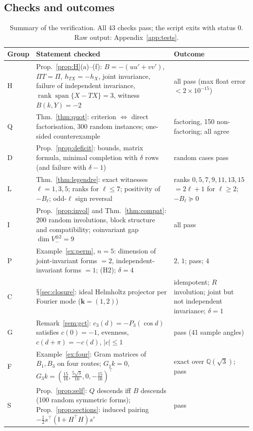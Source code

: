 \documentclass[11pt,a4paper]{article}
\renewcommand{\S}{\ensuremath{\mathsection}}
\newcommand{\rk}{\operatorname{rank}}
\newcommand{\spn}{\operatorname{span}}
\newcommand{\defic}{\delta}
\theoremstyle{plain}
\theoremstyle{definition}
\begin{document}
\subsection{Checks and outcomes}
\begin{table}[t]
\centering\small
\begin{tabularx}{\textwidth}{@{}l>{\raggedright\arraybackslash}X>{\raggedright\arraybackslash}p{}@{}}
\toprule
Group & Statement checked & Outcome\\
\midrule
H & Prop.~\ref{prop:H}(a)--(f): $B=-(uu'+vv')$, $\Pi T=\Pi$, $h_{TX}=-h_X$, joint invariance, failure of independent invariance, $\rk\spn\{X-TX\}=3$, witness $B(k,Y)=-2$ & all pass (max float error $<2\times10^{-15}$)\\
Q & Thm.~\ref{thm:quot}: criterion $\Leftrightarrow$ direct factorisation, 300 random instances; one-sided counterexample & 150 factoring, 150 non-factoring; all agree\\
D & Prop.~\ref{prop:deficit}: bounds, matrix formula, minimal completion with $\defic$ rows (and failure with $\defic-1$) & 300 random cases pass\\
L & Thm.~\ref{thm:legendre}: exact witnesses $\ell=1,3,5$; ranks for $\ell\le7$; positivity of $-B_\ell$; odd-$\ell$ sign reversal & ranks $0,5,7,9,11,13,15$ $=2\ell+1$ for $\ell\ge2$; $-B_\ell\succeq0$\\
I & Prop.~\ref{prop:invol} and Thm.~\ref{thm:compat}: 200 random involutions, block structure and compatibility; coinvariant gap $\dim V_-^{\otimes2}=9$ & all pass\\
P & Example~\ref{ex:perm}, $n=5$: dimension of joint-invariant forms $=2$, independent-invariant forms $=1$; (H2); $\defic=4$ & $2,\,1$; pass; $4$\\
C & \S\ref{sec:closure}: ideal Helmholtz projector per Fourier mode ($\mathbf k=(1,2)$) & idempotent; $R$ involution; joint but not independent invariance; $\defic=1$\\
G & Remark~\ref{rem:gct}: $c_3(d)=-P_3(\cos d)$ satisfies $c(0)=-1$, evenness, $c(d+\pi)=-c(d)$, $|c|\le1$ & pass (41 sample angles)\\
F & Example~\ref{ex:four}: Gram matrices of $B_1,B_3$ on four routes; $G_1k=0$, $G_3k=(\tfrac{15}{16},\tfrac{5\sqrt3}{16},0,-\tfrac{15}{16})^{\!\top}$ & exact over $\mathbb Q(\sqrt3)$; pass\\
S & Prop.~\ref{prop:self}: $Q$ descends iff $B$ descends (100 random symmetric forms); Prop.~\ref{prop:sections}: induced pairing $-\tfrac12s^{\!\top}(\mathsf I+H^{\!\top}H)s'$ & pass\\
\bottomrule
\end{tabularx}
\caption{Summary of the verification. All 43 checks pass; the script exits with status $0$. Raw output: Appendix~\ref{app:tests}.}\label{tab:checks}
\end{table}
\end{document}
